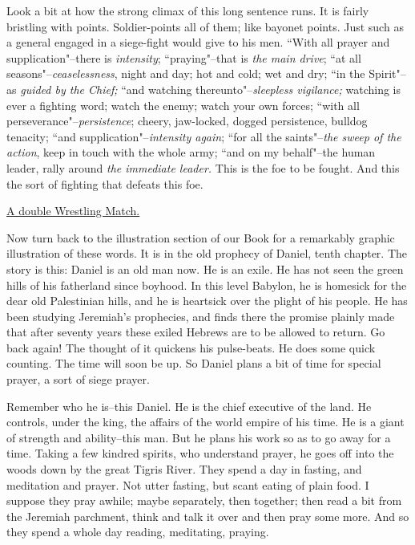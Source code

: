 Look a bit at how the strong climax of this long sentence runs. It is
fairly bristling with points. Soldier-points all of them; like bayonet
points. Just such as a general engaged in a siege-fight would give to his
men. ``With all prayer and supplication"--there is \textit{intensity};
``praying"--that is \textit{the main drive}; ``at all seasons"--\textit{ceaselessness},
night and day; hot and cold; wet and dry; ``in the Spirit"--as \textit{guided by
the Chief;} ``and watching thereunto"--\textit{sleepless vigilance;} watching is
ever a fighting word; watch the enemy; watch your own forces; ``with all
perseverance"--\textit{persistence}; cheery, jaw-locked, dogged persistence,
bulldog tenacity; ``and supplication"--\textit{intensity again}; ``for all the
saints"--\textit{the sweep of the action}, keep in touch with the whole army;
``and on my behalf"--the human leader, rally around \textit{the immediate leader.}
This is the foe to be fought. And this the sort of fighting that defeats
this foe.



\underline{A double Wrestling Match.}


Now turn back to the illustration section of our Book for a remarkably
graphic illustration of these words. It is in the old prophecy of Daniel,
tenth chapter. The story is this: Daniel is an old man now. He is an
exile. He has not seen the green hills of his fatherland since boyhood. In
this level Babylon, he is homesick for the dear old Palestinian hills, and
he is heartsick over the plight of his people. He has been studying
Jeremiah's prophecies, and finds there the promise plainly made that after
seventy years these exiled Hebrews are to be allowed to return. Go back
again! The thought of it quickens his pulse-beats. He does some quick
counting. The time will soon be up. So Daniel plans a bit of time for
special prayer, a sort of siege prayer.

Remember who he is--this Daniel. He is the chief executive of the land. He
controls, under the king, the affairs of the world empire of his time. He
is a giant of strength and ability--this man. But he plans his work so as
to go away for a time. Taking a few kindred spirits, who understand
prayer, he goes off into the woods down by the great Tigris River. They
spend a day in fasting, and meditation and prayer. Not utter fasting, but
scant eating of plain food. I suppose they pray awhile; maybe separately,
then together; then read a bit from the Jeremiah parchment, think and talk
it over and then pray some more. And so they spend a whole day reading,
meditating, praying.

